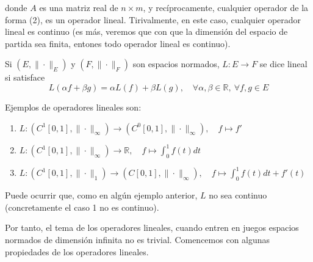 \documentclass{article}
\begin{document}
donde $A$ es una matriz real de $n\times m$, y recíprocamente, cualquier operador de la forma (2), es un operador lineal. Tirivalmente, en este caso, cualquier operador lineal es continuo (es más, veremos que con que la dimensión del espacio de partida sea finita, entones todo operador lineal es continuo). 

Si $(E,\|\cdot\|_E)$ y $(F,\|\cdot\|_F)$ son espacios normados, $L:E\rightarrow F$ se dice lineal si satisface 
\begin{equation*}
L(\alpha f+\beta g)=\alpha L(f)+\beta L(g),\quad \forall \alpha,\beta \in\mathbb{R},\:\forall f,g\in E
\end{equation*}

Ejemplos de operadores lineales son:
\begin{enumerate}
\item $L:(C^1[0,1],\|\cdot\|_\infty)\rightarrow (C^0[0,1],\|\cdot \|_\infty),\quad f\mapsto f'$

\item $L:(C^1[0,1],\|\cdot\|_{\infty})\rightarrow \mathbb{R},\quad f\mapsto \int_0^1 f(t)dt$

\item $L:(C^1[0,1],\|\cdot\|_1)\rightarrow (C[0,1],\|\cdot \|_{\infty}),\quad f\mapsto\int_0^1 f(t)dt+f'(t)$
\end{enumerate}

Puede ocurrir que, como en algún ejemplo anterior, $L$ no sea continuo (concretamente el caso 1 no es continuo).

Por tanto, el tema de los operadores lineales, cuando entren en juegos espacios normados de dimensión infinita no es trivial. Comencemos con algunas propiedades de los operadores lineales.\\
\end{document}
